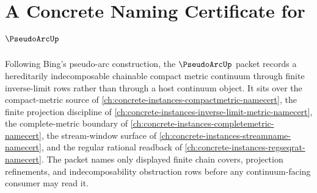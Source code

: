 \chapter{A Concrete Naming Certificate for $\PseudoArcUp$}
\label{ch:concrete-instances-pseudo-arc-namecert}

Following Bing's pseudo-arc construction, the $\PseudoArcUp$ packet records a hereditarily indecomposable chainable compact metric continuum through finite inverse-limit rows rather than through a host continuum object. It sits over the compact-metric source of \autoref{ch:concrete-instances-compactmetric-namecert}, the finite projection discipline of \autoref{ch:concrete-instances-inverse-limit-metric-namecert}, the complete-metric boundary of \autoref{ch:concrete-instances-completemetric-namecert}, the stream-window surface of \autoref{ch:concrete-instances-streamname-namecert}, and the regular rational readback of \autoref{ch:concrete-instances-regseqrat-namecert}. The packet names only displayed finite chain covers, projection refinements, and indecomposability obstruction rows before any continuum-facing consumer may read it.

